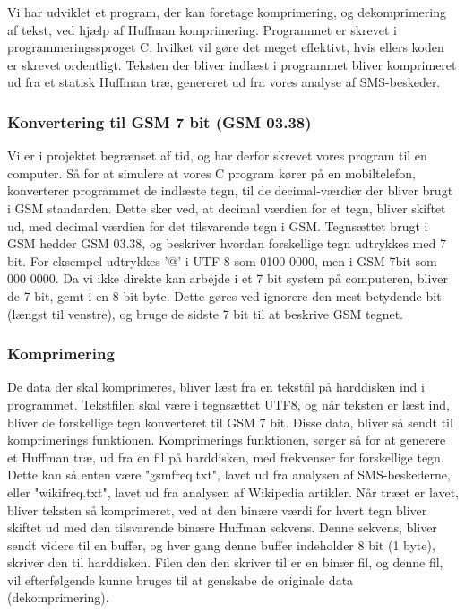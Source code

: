 Vi har udviklet et program, der kan foretage komprimering, og dekomprimering af tekst, ved hjælp af Huffman komprimering. Programmet er skrevet i programmeringssproget C, hvilket vil gøre det meget effektivt, hvis ellers koden er skrevet ordentligt.
Teksten der bliver indlæst i programmet bliver komprimeret ud fra et statisk Huffman træ, genereret ud fra vores analyse af SMS-beskeder.


\subsubsection{Konvertering til GSM 7 bit (GSM 03.38)}
Vi er i projektet begrænset af tid, og har derfor skrevet vores program til en computer. Så for at simulere at vores C program kører på en mobiltelefon, konverterer programmet de indlæste tegn, til de decimal-værdier der bliver brugt i GSM standarden. Dette sker ved, at decimal værdien for et tegn, bliver skiftet ud, med decimal værdien for det tilsvarende tegn i GSM. Tegnsættet brugt i GSM hedder GSM 03.38, og beskriver hvordan forskellige tegn udtrykkes med 7 bit. For eksempel udtrykkes '@' i UTF-8 som 0100 0000, men i GSM 7bit som 000 0000. Da vi ikke direkte kan arbejde i et 7 bit system på computeren, bliver de 7 bit, gemt i en 8 bit byte. Dette gøres ved ignorere den mest betydende bit (længst til venstre), og bruge de sidste 7 bit til at beskrive GSM tegnet.


\subsubsection{Komprimering}

De data der skal komprimeres, bliver læst fra en tekstfil på harddisken ind i programmet. Tekstfilen skal være i tegnsættet UTF8, og når teksten er læst ind, bliver de forskellige tegn konverteret til GSM 7 bit. Disse data, bliver så sendt til komprimerings funktionen. Komprimerings funktionen, sørger så for at generere et Huffman træ, ud fra en fil på harddisken, med frekvenser for forskellige tegn. Dette kan så enten være "gsmfreq.txt", lavet ud fra analysen af SMS-beskederne, eller "wikifreq.txt", lavet ud fra analysen af Wikipedia artikler.
Når træet er lavet, bliver teksten så komprimeret, ved at den binære værdi for hvert tegn bliver skiftet ud med den tilsvarende binære Huffman sekvens. Denne sekvens, bliver sendt videre til en buffer, og hver gang denne buffer indeholder 8 bit (1 byte), skriver den til harddisken. Filen den den skriver til er en binær fil, og denne fil, vil efterfølgende kunne bruges til at genskabe de originale data (dekomprimering).

